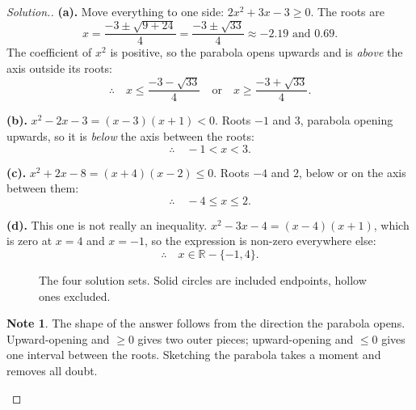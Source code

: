 \documentclass[11pt,a4paper]{article}
\theoremstyle{definition}
\newtheorem{note}[thm]{Note}
\newenvironment{solution}
  {\renewcommand{\qedsymbol}{}\begin{proof}[\textit{Solution}.]}
  {\end{proof}}
\begin{document}
\begin{solution}
\textbf{(a).} Move everything to one side: $2x^2+3x-3\geq 0$. The roots are
$$x=\frac{-3\pm\sqrt{9+24}}{4}=\frac{-3\pm\sqrt{33}}{4}\approx -2.19 \text{ and } 0.69.$$
The coefficient of $x^2$ is positive, so the parabola opens upwards and is
\emph{above} the axis outside its roots:
$$\therefore\quad x\leq\frac{-3-\sqrt{33}}{4}\quad\text{or}\quad
x\geq\frac{-3+\sqrt{33}}{4}.$$

\textbf{(b).} $x^2-2x-3=(x-3)(x+1)<0$. Roots $-1$ and $3$, parabola opening upwards, so
it is \emph{below} the axis between the roots:
$$\therefore\quad -1<x<3.$$

\textbf{(c).} $x^2+2x-8=(x+4)(x-2)\leq 0$. Roots $-4$ and $2$, below or on the axis
between them:
$$\therefore\quad -4\leq x\leq 2.$$

\textbf{(d).} This one is not really an inequality. $x^2-3x-4=(x-4)(x+1)$, which is zero
at $x=4$ and $x=-1$, so the expression is non-zero everywhere else:
$$\therefore\quad x\in\mathbb{R}-\{-1,4\}.$$

\begin{figure}[H]
\centering
{}
\caption{The four solution sets. Solid circles are included endpoints, hollow ones excluded.}
\end{figure}

\begin{note}
The shape of the answer follows from the direction the parabola opens. Upward-opening
and $\geq 0$ gives two outer pieces; upward-opening and $\leq 0$ gives one interval
between the roots. Sketching the parabola takes a moment and removes all doubt.
\end{note}
\end{solution}
\end{document}
